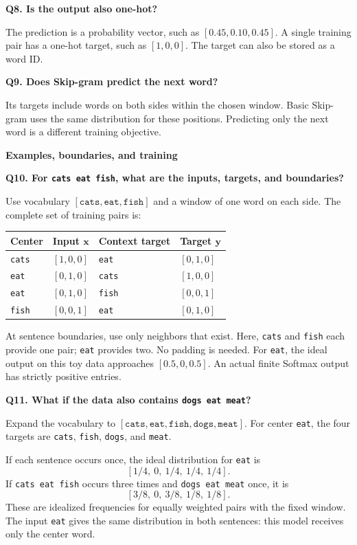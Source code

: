 \documentclass[11pt,a4paper]{article}
\newcommand{\qa}[2]{%
  \par\addvspace{8pt}\noindent\textbf{#1}\par\nobreak
  \noindent #2\par}
\newcommand{\pagetitle}[1]{%
  {\Large\sffamily\bfseries #1}\par\medskip}
\begin{document}
\qa{Q8. Is the output also one-hot?}{
The prediction is a probability vector, such as $[0.45,0.10,0.45]$.
A single training pair has a one-hot target, such as $[1,0,0]$.
The target can also be stored as a word ID.}

\qa{Q9. Does Skip-gram predict the next word?}{
Its targets include words on both sides within the chosen window.
Basic Skip-gram uses the same distribution for these positions.
Predicting only the next word is a different training objective.}

\clearpage
\pagetitle{Examples, boundaries, and training}

\qa{Q10. For \texttt{cats eat fish}, what are the inputs, targets, and boundaries?}{
Use vocabulary $[\texttt{cats},\texttt{eat},\texttt{fish}]$
and a window of one word on each side.
The complete set of training pairs is:}

\begin{center}
\begin{tabular}{@{}llll@{}}
\toprule
Center & Input $\mathbf{x}$ & Context target & Target $\mathbf{y}$ \\
\midrule
\texttt{cats} & $[1,0,0]$ & \texttt{eat}  & $[0,1,0]$ \\
\texttt{eat}  & $[0,1,0]$ & \texttt{cats} & $[1,0,0]$ \\
\texttt{eat}  & $[0,1,0]$ & \texttt{fish} & $[0,0,1]$ \\
\texttt{fish} & $[0,0,1]$ & \texttt{eat}  & $[0,1,0]$ \\
\bottomrule
\end{tabular}
\end{center}

At sentence boundaries, use only neighbors that exist.
Here, \texttt{cats} and \texttt{fish} each provide one pair;
\texttt{eat} provides two. No padding is needed.
For \texttt{eat}, the ideal output on this toy data approaches
$[0.5,0,0.5]$.
An actual finite Softmax output has strictly positive entries.

\qa{Q11. What if the data also contains \texttt{dogs eat meat}?}{
Expand the vocabulary to
$[\texttt{cats},\texttt{eat},\texttt{fish},\texttt{dogs},\texttt{meat}]$.
For center \texttt{eat}, the four targets are
\texttt{cats}, \texttt{fish}, \texttt{dogs}, and \texttt{meat}.}

If each sentence occurs once, the ideal distribution for \texttt{eat} is
\[
[1/4,\ 0,\ 1/4,\ 1/4,\ 1/4].
\]
If \texttt{cats eat fish} occurs three times and \texttt{dogs eat meat} once, it is
\[
[3/8,\ 0,\ 3/8,\ 1/8,\ 1/8].
\]
These are idealized frequencies for equally weighted pairs with the fixed window.
The input \texttt{eat} gives the same distribution in both sentences:
this model receives only the center word.
\end{document}
